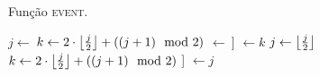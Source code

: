 \begin{algorithm}
    \caption[Algoritmo \textsc{event} do torneio cinético]{Função \textsc{event}.} \label{alg:torneio:evento}
    \begin{algorithmic}[1]
            \State $j \leftarrow~$\indt[$i$]
            \State $k \leftarrow 2\cdot \left\lfloor \frac{j}{2} \right\rfloor +
            ((j + 1)\mod2)$ 
                \State {}
                $\leftarrow~$\torneio[$j$]
                \State \indt[\torneio[$k$]] $\leftarrow k$
                \State {}
                \State $j \leftarrow \left\lfloor \frac{j}{2} \right\rfloor$
                \State $k \leftarrow 2\cdot \left\lfloor \frac{j}{2} \right\rfloor
                + ((j + 1)\mod2)$
            \EndWhile
            \State \indt[\torneio[$j$]] $\leftarrow j$
            \State {}
        \EndFunction
    \end{algorithmic}
\end{algorithm}